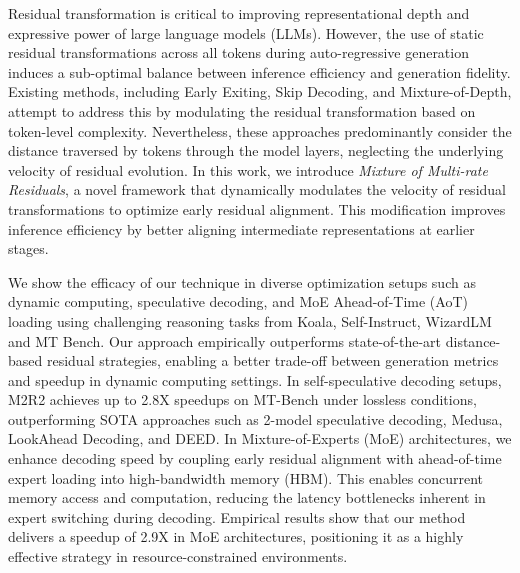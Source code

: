 Residual transformation is critical to improving representational depth and expressive power of large language models (LLMs). However, the use of static residual transformations across all tokens during auto-regressive generation induces a sub-optimal balance between inference efficiency and generation fidelity. Existing methods, including Early Exiting, Skip Decoding, and Mixture-of-Depth, attempt to address this by modulating the residual transformation based on token-level complexity. Nevertheless, these approaches predominantly consider the distance traversed by tokens through the model layers, neglecting the underlying velocity of residual evolution. In this work, we introduce \textit{Mixture of Multi-rate Residuals}, a novel framework that dynamically modulates the velocity of residual transformations to optimize early residual alignment. This modification improves inference efficiency by better aligning intermediate representations at earlier stages.

We show the efficacy of our technique in diverse optimization setups such as dynamic computing, speculative decoding, and MoE Ahead-of-Time (AoT) loading using challenging reasoning tasks from Koala, Self-Instruct, WizardLM and MT Bench. Our approach empirically outperforms state-of-the-art distance-based residual strategies, enabling a better trade-off between generation metrics and speedup in dynamic computing settings. In self-speculative decoding setups, M2R2 achieves up to 2.8X speedups on MT-Bench under lossless conditions, outperforming SOTA approaches such as 2-model speculative decoding, Medusa, LookAhead Decoding, and DEED. In Mixture-of-Experts (MoE) architectures, we enhance decoding speed by coupling early residual alignment with ahead-of-time expert loading into high-bandwidth memory (HBM). This enables concurrent memory access and computation, reducing the latency bottlenecks inherent in expert switching during decoding. Empirical results show that our method delivers a speedup of 2.9X in MoE architectures, positioning it as a highly effective strategy in resource-constrained environments.


 